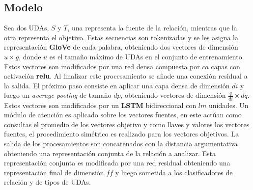 \subsection{Modelo}

Sea dos UDAs, $S$ y $T$, una representa la fuente de la relación, mientras que la otra representa
el objetivo. Estas secuencias son tokenizadas y se les asigna la representación \textbf{GloVe} de cada palabra, obteniendo
dos vectores de dimensión $u \times g$, donde $u$ es el tamaño máximo de UDAs en el conjunto de entrenamiento.
Estos vectores son modificados por una red densa compuesta por $ca$ capas con activación \textbf{relu}. 
Al finalizar este procesamiento se añade una conexión residual
a la salida. El próximo paso consiste en aplicar una capa densa de dimensión $di$ y luego un \emph{average pooling}
de tamaño $dp$, obteniendo vectores de dimensión $\frac{q}{di} \times dq$. 
Estos vectores son modificados por un \textbf{LSTM} bidireccional con $lm$ unidades. Un módulo de atención es aplicado 
sobre los vectores fuentes, 
en este actúan como consultas el promedio de los vectores objetivo y como llaves y valores los vectores fuentes,
el procedimiento simétrico es realizado para los vectores objetivos.
La salida de los procesamientos son concatenados con la distancia argumentativa obteniendo una representación 
conjunta de la relación a analizar. Esta representación conjunta es modificada por una red residual obteniendo
una representación final de dimensión $ff$ y luego sometida a los clasificadores de relación y de tipos de UDAs.

